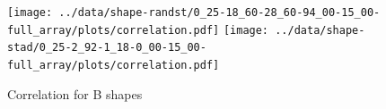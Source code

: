 \documentclass[letterpaper,twocolumn,amsmath,amssymb,pre]{revtex4-1}
\begin{document}


\begin{figure}
  \texttt{[image: ../data/shape-randst/0\_25-18\_60-28\_60-94\_00-15\_00-full\_array/plots/correlation.pdf]}
  \texttt{[image: ../data/shape-stad/0\_25-2\_92-1\_18-0\_00-15\_00-full\_array/plots/correlation.pdf]}
  \caption{Correlation for B shapes}
  \label{corr-B}
\end{figure}
\end{document}
